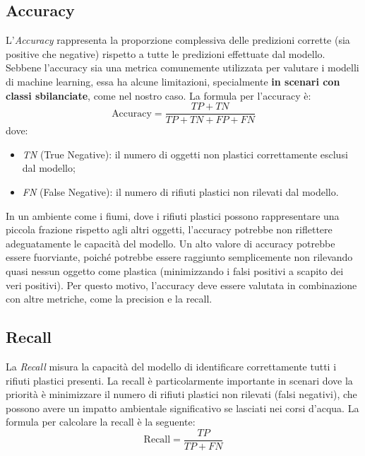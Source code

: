\subsection{Accuracy}

L'\textit{Accuracy} rappresenta la proporzione complessiva delle predizioni corrette (sia positive che negative) rispetto a tutte le predizioni effettuate dal modello. Sebbene l'accuracy sia una metrica comunemente utilizzata per valutare i modelli di machine learning, essa ha alcune limitazioni, specialmente \textbf{in scenari con classi sbilanciate}, come nel nostro caso. La formula per l'accuracy è:
\begin{equation}
\text{Accuracy} = \frac{TP + TN}{TP + TN + FP + FN}
\end{equation}
dove:
\begin{itemize}
    \item \textit{TN} (True Negative): il numero di oggetti non plastici correttamente esclusi dal modello;
    \item \textit{FN} (False Negative): il numero di rifiuti plastici non rilevati dal modello.
\end{itemize}

In un ambiente come i fiumi, dove i rifiuti plastici possono rappresentare una piccola frazione rispetto agli altri oggetti, l'accuracy potrebbe non riflettere adeguatamente le capacità del modello. Un alto valore di accuracy potrebbe essere fuorviante, poiché potrebbe essere raggiunto semplicemente non rilevando quasi nessun oggetto come plastica (minimizzando i falsi positivi a scapito dei veri positivi). Per questo motivo, l'accuracy deve essere valutata in combinazione con altre metriche, come la precision e la recall.

\subsection{Recall}

La \textit{Recall} misura la capacità del modello di identificare correttamente tutti i rifiuti plastici presenti. La recall è particolarmente importante in scenari dove la priorità è minimizzare il numero di rifiuti plastici non rilevati (falsi negativi), che possono avere un impatto ambientale significativo se lasciati nei corsi d'acqua. La formula per calcolare la recall è la seguente:
\begin{equation}
\text{Recall} = \frac{TP}{TP + FN}
\end{equation}

